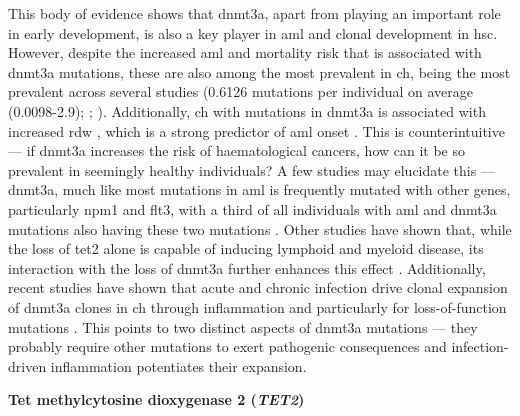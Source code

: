 This body of evidence shows that \ac{dnmt3a}, apart from playing an important role in early development, is also a key player in \ac{aml} and clonal development in \ac{hsc}. However, despite the increased \ac{aml} and mortality risk that is associated with \ac{dnmt3a} mutations, these are also among the most prevalent in \ac{ch}, being the most prevalent across several studies \cite{Jaiswal2014-rl,Genovese2014-eu,Zink2017-zi,Bolton2020-ct,Coombs2017-ph,McKerrell2015-rl,Acuna-Hidalgo2017-ng,Desai2018-pj,Young2016-du,Young2019-rz} (0.6126 mutations per individual on average (0.0098-2.9); ; ). Additionally, \ac{ch} with mutations in \ac{dnmt3a} is associated with increased \ac{rdw} \cite{Dawoud2020-af}, which is a strong predictor of \ac{aml} onset \cite{Abelson2018-wh}. This is counterintuitive --- if \ac{dnmt3a} increases the risk of haematological cancers, how can it be so prevalent in seemingly healthy individuals? A few studies may elucidate this --- \ac{dnmt3a}, much like most mutations in \ac{aml} is frequently mutated with other genes, particularly \ac{npm1} and \ac{flt3}, with a third of all individuals with \ac{aml} and \ac{dnmt3a} mutations also having these two mutations \cite{noauthor_2013-ti,Bezerra2020-zc}. Other studies have shown that, while the loss of \ac{tet2} alone is capable of inducing lymphoid and myeloid disease, its interaction with the loss of \ac{dnmt3a} further enhances this effect \cite{Zhang2016-ys}. Additionally, recent studies have shown that acute and chronic infection drive clonal expansion of \ac{dnmt3a} clones in \ac{ch} through inflammation and particularly for loss-of-function mutations \cite{Hormaechea_Agulla2019-cd,Hormaechea-Agulla2021-kr}. This points to two distinct aspects of \ac{dnmt3a} mutations --- they probably require other mutations to exert pathogenic consequences and infection-driven inflammation potentiates their expansion.

\noindent \textbf{Tet methylcytosine dioxygenase 2 (\textit{TET2})}

